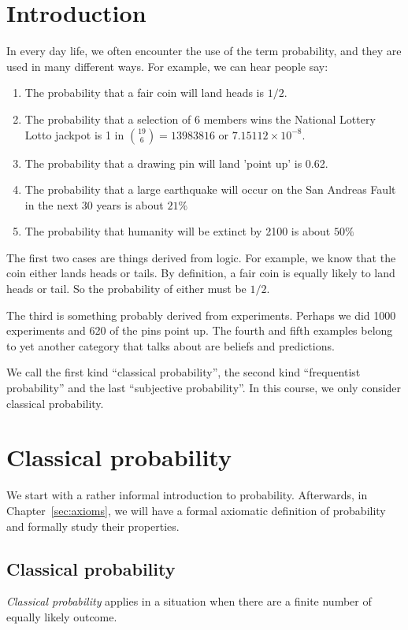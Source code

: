 \documentclass[a4paper]{article}
\begin{document}
\tableofcontents
\setcounter{section}{-1}
\section{Introduction}
In every day life, we often encounter the use of the term probability, and they are used in many different ways. For example, we can hear people say:
\begin{enumerate}
  \item The probability that a fair coin will land heads is $1/2$.
  \item The probability that a selection of 6 members wins the National Lottery Lotto jackpot is 1 in $\binom{19}{6} = 13 983 816$ or $7.15112\times 10^{-8}$.
  \item The probability that a drawing pin will land 'point up' is 0.62.
  \item The probability that a large earthquake will occur on the San Andreas Fault in the next 30 years is about $21\%$
  \item The probability that humanity will be extinct by 2100 is about $50\%$
\end{enumerate}
The first two cases are things derived from logic. For example, we know that the coin either lands heads or tails. By definition, a fair coin is equally likely to land heads or tail. So the probability of either must be $1/2$.

The third is something probably derived from experiments. Perhaps we did 1000 experiments and 620 of the pins point up. The fourth and fifth examples belong to yet another category that talks about are beliefs and predictions.

We call the first kind ``classical probability'', the second kind ``frequentist probability'' and the last ``subjective probability''. In this course, we only consider classical probability.

\section{Classical probability}
We start with a rather informal introduction to probability. Afterwards, in Chapter~\ref{sec:axioms}, we will have a formal axiomatic definition of probability and formally study their properties.

\subsection{Classical probability}
\begin{defi}
  \emph{Classical probability} applies in a situation when there are a finite number of equally likely outcome.
\end{defi}
\end{document}
